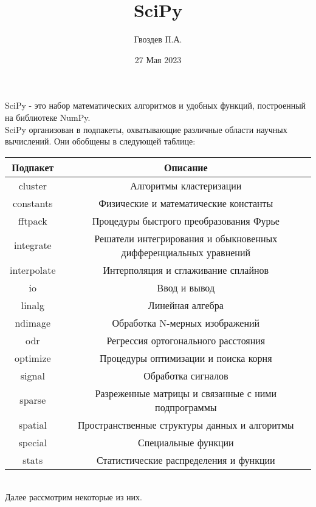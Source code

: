 \documentclass{article}
\author{Гвоздев П.А.}
\title{SciPy}
\date{27 Мая 2023}
\begin{document}
\maketitle
\newpage

SciPy - это набор математических алгоритмов и удобных функций, построенный на библиотеке NumPy.\\
SciPy организован в подпакеты, охватывающие различные области научных вычислений. Они обобщены в следующей таблице:
\\
\begin{center}
\begin{tabular}{ |c|c| } 
 \hline
 \textbf{Подпакет} & \textbf{Описание}  \\
 \hline
 \hline
 cluster & Алгоритмы кластеризации  \\ 
  \hline
 constants & Физические и математические константы  \\ 
  \hline
 fftpack &  Процедуры быстрого преобразования Фурье \\ 
  \hline
 integrate & Решатели интегрирования и обыкновенных дифференциальных уравнений  \\ 
  \hline
 interpolate & Интерполяция и сглаживание сплайнов  \\ 
  \hline
 io & Ввод и вывод  \\ 
  \hline
 linalg & Линейная алгебра \\ 
  \hline
 ndimage & Обработка N-мерных изображений \\ 
  \hline
 odr & Регрессия ортогонального расстояния  \\ 
  \hline
 optimize & Процедуры оптимизации и поиска корня  \\ 
  \hline
 signal & Обработка сигналов  \\ 
  \hline
 sparse & Разреженные матрицы и связанные с ними подпрограммы  \\ 
  \hline
 spatial & Пространственные структуры данных и алгоритмы  \\ 
  \hline
 special & Специальные функции  \\ 
  \hline
 stats & Статистические распределения и функции \\ 
 \hline
\end{tabular}
\end{center}
\\
Далее рассмотрим некоторые из них.
\end{document}
